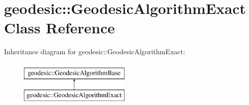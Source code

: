 \hypertarget{classgeodesic_1_1_geodesic_algorithm_exact}{}\section{geodesic\+:\+:Geodesic\+Algorithm\+Exact Class Reference}
\label{classgeodesic_1_1_geodesic_algorithm_exact}
Inheritance diagram for geodesic\+:\+:Geodesic\+Algorithm\+Exact\+:\begin{figure}[H]
\begin{center}
\leavevmode
\includegraphics[height=2.000000cm]{classgeodesic_1_1_geodesic_algorithm_exact}
\end{center}
\end{figure}
